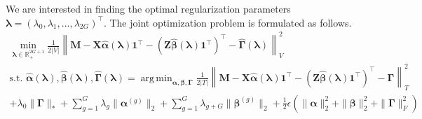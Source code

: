 \documentclass[12pt]{article}
\DeclareMathOperator*{\argmin}{arg\,min}
\begin{document}
We are interested in finding the optimal regularization parameters $\boldsymbol{\lambda} = (\lambda_0, \lambda_1, ...,  \lambda_{2G})^\top$. The joint optimization problem is formulated as follows.
\begin{equation}
	\begin{array}{c}
		\min_{\boldsymbol{\lambda} \in \mathbb{R}^{2G+1}_{+}} \frac{1}{2|V|}
		\left \| 
		\boldsymbol{M} 
		- \boldsymbol{X} \hat{\boldsymbol{\alpha}}(\boldsymbol{\lambda})  \boldsymbol{1}^\top 
		- (\boldsymbol{Z} \hat{\boldsymbol{\beta}}(\boldsymbol{\lambda})  \boldsymbol{1}^\top )^\top
		- \hat{\boldsymbol{\Gamma}}(\boldsymbol{\lambda})
		\right \|^2_V \\
		\text{s.t. }
		\hat{\boldsymbol{\alpha}}(\boldsymbol{\lambda}),
		\hat{\boldsymbol{\beta}}(\boldsymbol{\lambda}),
		\hat{\boldsymbol{\Gamma}}(\boldsymbol{\lambda})
		 =
		\argmin_{\boldsymbol{\alpha}, \boldsymbol{\beta}, \boldsymbol{\Gamma}} 
		\frac{1}{2|T|} 
		\left \| 
		\boldsymbol{M} 
		- \boldsymbol{X} \hat{\boldsymbol{\alpha}}(\boldsymbol{\lambda})  \boldsymbol{1}^\top 
		- (\boldsymbol{Z} \hat{\boldsymbol{\beta}}(\boldsymbol{\lambda})  \boldsymbol{1}^\top )^\top
		- \boldsymbol{\Gamma}
		\right \|^2_T \\
		+ \lambda_0 \| \boldsymbol\Gamma \|_*
		+ \sum_{g=1}^G \lambda_g \| \boldsymbol\alpha^{(g)} \|_2
		+ \sum_{g=1}^G  \lambda_{g+G} \| \boldsymbol\beta^{(g)} \|_2
		+ \frac{1}{2} \epsilon \left (
		\| \boldsymbol\alpha \|_2^2 + \| \boldsymbol\beta \|_2^2
		+ \| \boldsymbol{\Gamma}\|^2_F
		\right )
	\end{array}
	\label{eq:matrix_comp_groups}
\end{equation}
\end{document}
